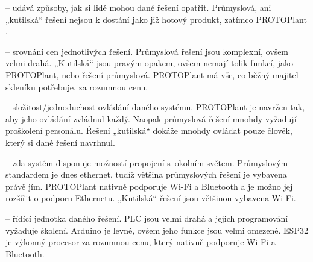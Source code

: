 \noindent{} -- udává způsoby, jak si lidé mohou dané řešení opatřit.
Průmyslová, ani „kutilská“ řešení nejsou k dostání jako již hotový produkt, zatímco PROTOPlant . \newline

\noindent{} -- srovnání cen jednotlivých řešení.
Průmyslová řešení jsou komplexní, ovšem velmi drahá.
„Kutilská“ jsou pravým opakem, ovšem nemají tolik funkcí, jako PROTOPlant, nebo řešení průmyslová.
PROTOPlant má vše, co běžný majitel skleníku potřebuje, za rozumnou cenu. \newline

\noindent{} -- složitost/jednoduchost ovládání daného systému.
PROTOPlant je navržen tak, aby jeho ovládání zvládnul každý.
Naopak průmyslová řešení mnohdy vyžadují proškolení personálu.
Řešení „kutilská“ dokáže mnohdy ovládat pouze člověk, který si dané řešení navrhnul. \newline

\noindent{} -- zda systém disponuje možností propojení s~okolním světem.
Průmyslovým standardem je dnes ethernet, tudíž většina průmyslových řešení je vybavena právě jím.
PROTOPlant nativně podporuje Wi-Fi a Bluetooth a je možno jej rozšířit o podporu Ethernetu.
„Kutilská“ řešení jsou většinou vybavena Wi-Fi. \newline

\noindent{} -- řídící jednotka daného řešení.
PLC jsou velmi drahá a jejich programování vyžaduje školení.
Arduino je levné, ovšem jeho funkce jsou velmi omezené.
ESP32 je výkonný procesor za rozumnou cenu, který nativně podporuje Wi-Fi a Bluetooth. \newline

\newpage